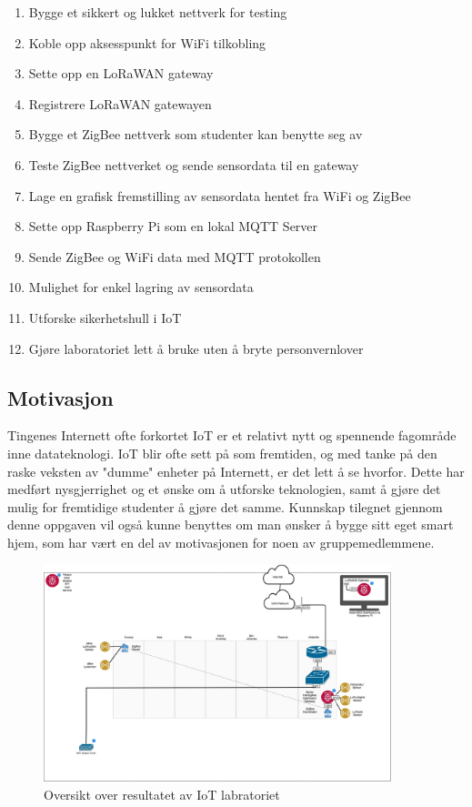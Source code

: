 \documentclass{article}
\begin{document}
\begin{enumerate}
	\item Bygge et sikkert og lukket nettverk for testing
	\item Koble opp aksesspunkt for WiFi tilkobling
	\item Sette opp en LoRaWAN gateway
	\item Registrere LoRaWAN gatewayen
	\item Bygge et ZigBee nettverk som studenter kan benytte seg av
	\item Teste ZigBee nettverket og sende sensordata til en gateway
	\item Lage en grafisk fremstilling av sensordata hentet fra WiFi og ZigBee
	\item Sette opp Raspberry Pi som en lokal MQTT Server
	\item Sende ZigBee og WiFi data med MQTT protokollen
	\item Mulighet for enkel lagring av sensordata
	\item Utforske sikerhetshull i IoT
	\item Gjøre laboratoriet lett å bruke uten å bryte personvernlover
\end{enumerate}

\subsection{Motivasjon}
Tingenes Internett ofte forkortet IoT er et relativt nytt og spennende fagområde inne datateknologi. IoT blir ofte sett på som fremtiden, og med tanke på den raske veksten av "dumme" enheter på Internett, er det lett å se hvorfor. Dette har medført nysgjerrighet og et ønske om å utforske teknologien, samt å gjøre det mulig for fremtidige studenter å gjøre det samme. Kunnskap tilegnet gjennom denne oppgaven vil også kunne benyttes om man ønsker å bygge sitt eget smart hjem, som har vært en del av motivasjonen for noen av gruppemedlemmene.

\begin{figure}[h!]
 \centering
     \includegraphics[width=0.9\textwidth]{lab}
 \caption{Oversikt over resultatet av IoT labratoriet}
\end{figure}
\end{document}
